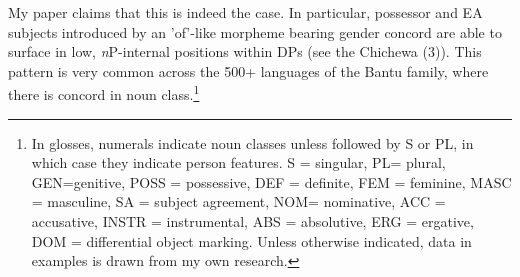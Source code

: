 \documentclass[output=paper
,modfonts
,nonflat]{langsci/langscibook}
\begin{document}
My paper claims that this is indeed the case. In particular, possessor and EA {\textquotedbl}subjects{\textquotedbl} introduced by an 'of'-like morpheme bearing gender concord are able to surface in low, \textit{n}P-internal positions within DPs (see the Chichewa (3)). This pattern is very common across the 500+ languages of the Bantu family, where there is concord in noun class.\footnote{In glosses, numerals indicate noun classes unless followed by S or PL, in which case they indicate person features. S = singular, PL= plural, GEN=genitive, POSS = possessive, DEF = definite, FEM = feminine, MASC = masculine, SA = subject agreement, NOM= nominative, ACC = accusative, INSTR = instrumental, ABS = absolutive, ERG = ergative, DOM = differential object marking. Unless otherwise indicated, data in examples is drawn from my own research.}
\end{document}
